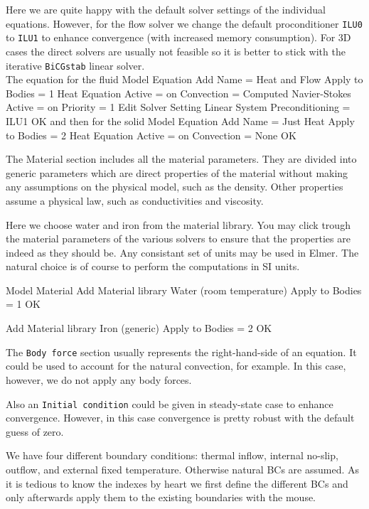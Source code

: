 Here we are quite happy with the default solver settings of the individual equations. 
However, for the flow solver we change the default proconditioner \texttt{ILU0} to \texttt{ILU1} to 
enhance convergence (with increased memory consumption). For 3D cases the direct solvers are usually 
not feasible so it is better to stick with the iterative \texttt{BiCGstab} linear solver. 
\\
The equation for the fluid
\ttbegin
Model
  Equation
    Add
    Name = Heat and Flow
    Apply to Bodies = 1
    Heat Equation
      Active = on
      Convection = Computed
    Navier-Stokes 
      Active = on
      Priority = 1
      Edit Solver Setting
        Linear System
          Preconditioning = ILU1
    OK
\ttend        
and then for the solid
\ttbegin
Model
  Equation
    Add
    Name = Just Heat
    Apply to Bodies = 2
    Heat Equation
      Active = on
      Convection = None
    OK
\ttend    


The Material section includes all the material parameters.
They are divided into generic parameters which are direct properties of the material
without making any assumptions on the physical model, such as the density. Other properties assume
a physical law, such as conductivities and viscosity. 

Here we choose water and iron from the material library.
You may click trough the material parameters of the various solvers to ensure that
the properties are indeed as they should be. Any consistant set of units may be used in Elmer.
The natural choice is of course to perform the computations in SI units. 

\ttbegin
Model
  Material
    Add
    Material library    
      Water (room temperature)
    Apply to Bodies = 1 
    OK

    Add
    Material library    
      Iron (generic)
    Apply to Bodies = 2
    OK
\ttend

The \texttt{Body force} section usually represents the right-hand-side of an equation. It could be used to account for the 
natural convection, for example. In this case, however, we do not apply any body forces.

Also an \texttt{Initial condition} could be given in steady-state case to enhance convergence. However, 
in this case convergence is pretty robust with the default guess of zero.

We have four different boundary conditions: thermal inflow, internal no-slip, 
outflow, and external fixed temperature. Otherwise natural BCs are assumed.
As it is tedious to know the indexes by heart we 
first define the different BCs and only afterwards apply them to the existing boundaries 
with the mouse. 

